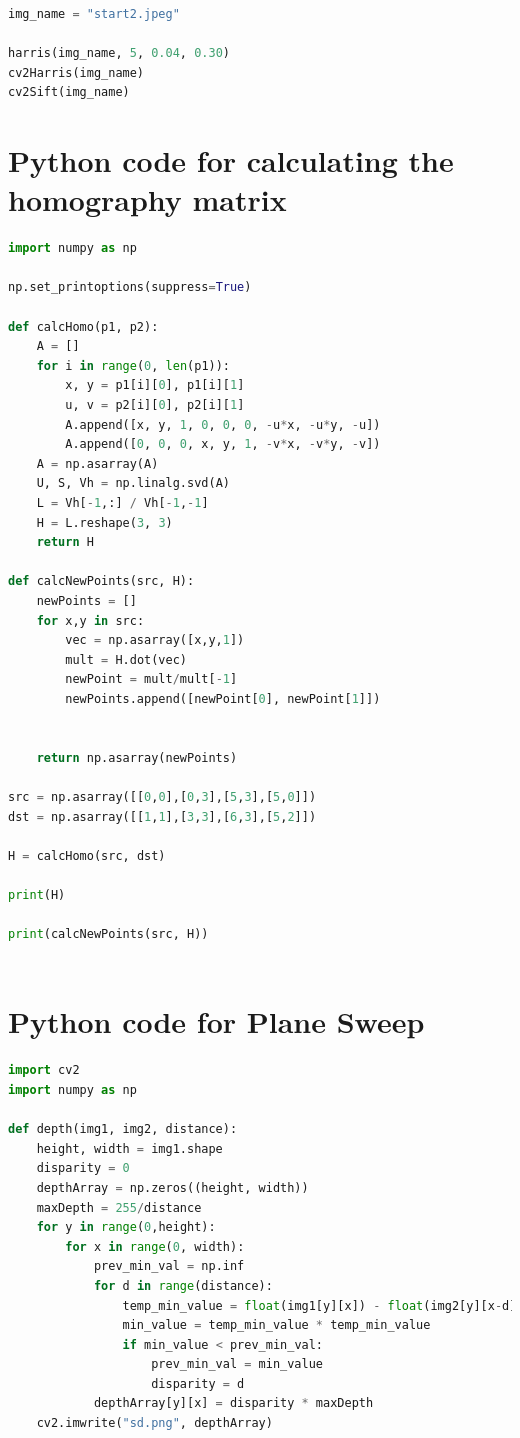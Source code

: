 \documentclass{article}
\begin{document}
\begin{appendices}
\begin{lstlisting}[language=Python]
img_name = "start2.jpeg"

harris(img_name, 5, 0.04, 0.30)
cv2Harris(img_name)
cv2Sift(img_name)

        \end{lstlisting}
    \section{Python code for calculating the homography matrix}
    \label{appendix:homo}
    \begin{lstlisting}[language=Python]
import numpy as np

np.set_printoptions(suppress=True)

def calcHomo(p1, p2):
    A = []
    for i in range(0, len(p1)):
        x, y = p1[i][0], p1[i][1]
        u, v = p2[i][0], p2[i][1]
        A.append([x, y, 1, 0, 0, 0, -u*x, -u*y, -u])
        A.append([0, 0, 0, x, y, 1, -v*x, -v*y, -v])
    A = np.asarray(A)
    U, S, Vh = np.linalg.svd(A)
    L = Vh[-1,:] / Vh[-1,-1]
    H = L.reshape(3, 3)
    return H

def calcNewPoints(src, H):
    newPoints = []
    for x,y in src:
        vec = np.asarray([x,y,1])
        mult = H.dot(vec)
        newPoint = mult/mult[-1]
        newPoints.append([newPoint[0], newPoint[1]])

        
    return np.asarray(newPoints)

src = np.asarray([[0,0],[0,3],[5,3],[5,0]])
dst = np.asarray([[1,1],[3,3],[6,3],[5,2]])

H = calcHomo(src, dst)

print(H)

print(calcNewPoints(src, H))
        

    \end{lstlisting}
    \section{Python code for Plane Sweep}
    \label{appendix:PS}
    \begin{lstlisting}[language=python]
import cv2
import numpy as np

def depth(img1, img2, distance):
    height, width = img1.shape
    disparity = 0
    depthArray = np.zeros((height, width))
    maxDepth = 255/distance
    for y in range(0,height):
        for x in range(0, width):
            prev_min_val = np.inf
            for d in range(distance):
                temp_min_value = float(img1[y][x]) - float(img2[y][x-d])
                min_value = temp_min_value * temp_min_value
                if min_value < prev_min_val:
                    prev_min_val = min_value
                    disparity = d
            depthArray[y][x] = disparity * maxDepth
    cv2.imwrite("sd.png", depthArray)







\end{lstlisting}
\end{appendices}
\end{document}
